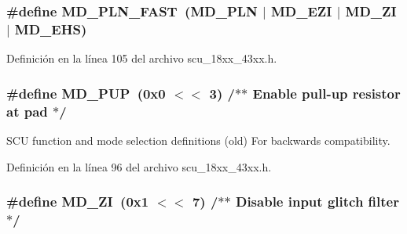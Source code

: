 \subsubsection[{\texorpdfstring{M\+D\+\_\+\+P\+L\+N\+\_\+\+F\+A\+ST}{MD_PLN_FAST}}]{\setlength{\rightskip}{0pt plus 5cm}\#define M\+D\+\_\+\+P\+L\+N\+\_\+\+F\+A\+ST~({\bf M\+D\+\_\+\+P\+LN} $\vert$ {\bf M\+D\+\_\+\+E\+ZI} $\vert$ {\bf M\+D\+\_\+\+ZI} $\vert$ {\bf M\+D\+\_\+\+E\+HS})}\hypertarget{group___s_c_u__18_x_x__43_x_x_ga0073c0520b247fe7d511d9b2b2386a20}{}\label{group___s_c_u__18_x_x__43_x_x_ga0073c0520b247fe7d511d9b2b2386a20}


Definición en la línea 105 del archivo scu\+\_\+18xx\+\_\+43xx.\+h.

\subsubsection[{\texorpdfstring{M\+D\+\_\+\+P\+UP}{MD_PUP}}]{\setlength{\rightskip}{0pt plus 5cm}\#define M\+D\+\_\+\+P\+UP~(0x0 $<$$<$ 3)		/$\ast$$\ast$ Enable pull-\/up resistor at pad $\ast$/}\hypertarget{group___s_c_u__18_x_x__43_x_x_ga71356d77e0a6639fec743a8e73f24892}{}\label{group___s_c_u__18_x_x__43_x_x_ga71356d77e0a6639fec743a8e73f24892}
S\+CU function and mode selection definitions (old) For backwards compatibility. 

Definición en la línea 96 del archivo scu\+\_\+18xx\+\_\+43xx.\+h.

\subsubsection[{\texorpdfstring{M\+D\+\_\+\+ZI}{MD_ZI}}]{\setlength{\rightskip}{0pt plus 5cm}\#define M\+D\+\_\+\+ZI~(0x1 $<$$<$ 7)		/$\ast$$\ast$ Disable input glitch filter $\ast$/}\hypertarget{group___s_c_u__18_x_x__43_x_x_ga51a31f73d049149233853e096f585aab}{}\label{group___s_c_u__18_x_x__43_x_x_ga51a31f73d049149233853e096f585aab}


